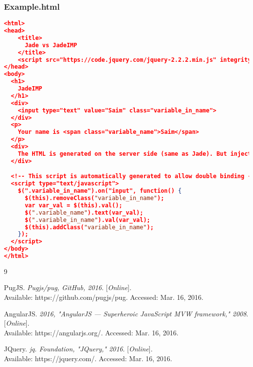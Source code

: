 \documentclass{article}
\begin{document}
\subsubsection{Example.html}
\begin{lstlisting}[language=json,firstnumber=1]
<html>
<head>
    <title>
      Jade vs JadeIMP
    </title>
    <script src="https://code.jquery.com/jquery-2.2.2.min.js" integrity="sha256-36cp2Co+/62rEAAYHLmRCPIych47CvdM+uTBJwSzWjI=" crossorigin="anonymous"></script>
</head>
<body>
  <h1>
    JadeIMP
  </h1>
  <div>
    <input type="text" value="Saim" class="variable_in_name">
  </div>
  <p>
    Your name is <span class="variable_name">Saim</span>
  </p>
  <div>
    The HTML is generated on the server side (same as Jade). But injecting certain scripts into the generated code allows the HTML to be manipulated on the client side.
  </div>

  <!-- This script is automatically generated to allow double binding -->
  <script type="text/javascript">
    $(".variable_in_name").on("input", function() {
      $(this).removeClass("variable_in_name");
      var var_val = $(this).val();
      $(".variable_name").text(var_val);
      $(".variable_in_name").val(var_val);
      $(this).addClass("variable_in_name");
    });
  </script>
</body>
</html>
\end{lstlisting}

\begin{thebibliography}{9}
  
  PugJS. 
  \textit{Pugjs/pug, GitHub, 2016}.
  [\textit{Online}]. \\
  Available: https://github.com/pugjs/pug. Accessed: Mar. 16, 2016.
  
  AngularJS. 
  \textit{2016, "AngularJS — Superheroic JavaScript MVW framework," 2008}.
  [\textit{Online}]. \\
  Available: https://angularjs.org/. Accessed: Mar. 16, 2016.
  
  JQuery. 
  \textit{jq. Foundation, "JQuery," 2016}.
  [\textit{Online}]. \\
  Available: https://jquery.com/. Accessed: Mar. 16, 2016.

\end{thebibliography}
\end{document}
